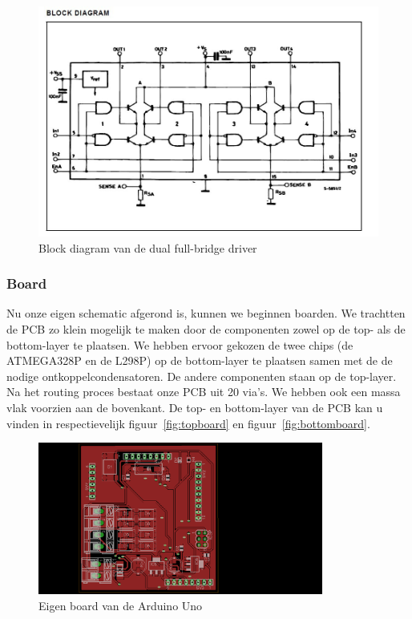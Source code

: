 \begin{figure}[H]
	\centering
	\includegraphics[width=\textheight, angle=90]{bridge.png}
	\caption{Block diagram van de dual full-bridge driver\label{fig:bridge}}
\end{figure}


\subsubsection{Board}
Nu onze eigen schematic afgerond is, kunnen we beginnen boarden. We trachtten de PCB zo klein mogelijk te maken door de componenten zowel op de top- als de bottom-layer te plaatsen. We hebben ervoor gekozen de twee chips (de ATMEGA328P en de L298P) op de bottom-layer te plaatsen samen met de de nodige ontkoppelcondensatoren. De andere componenten staan op de top-layer. Na het routing proces bestaat onze PCB uit 20 via's. We hebben ook een massa vlak voorzien aan de bovenkant. De top- en bottom-layer van de PCB kan u vinden in respectievelijk figuur~\vref{fig:topboard} en figuur~\vref{fig:bottomboard}.

\begin{figure}[H]
	\centering
	\includegraphics[height=5cm]{topboard.png}
	\caption{Eigen board van de Arduino Uno\label{fig:topboard}}
\end{figure}

